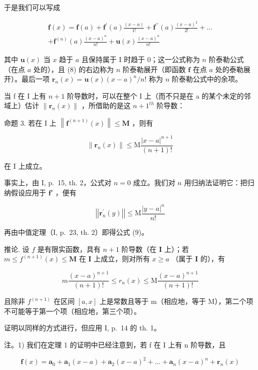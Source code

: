 于是我们可以写成

\[
\begin{array}{c} \mathbf {f} (x) = \mathbf {f} (a) + \mathbf {f} ^ {\prime} (a) \frac {(x - a)}{1 !} + \mathbf {f} ^ {\prime \prime} (a) \frac {(x - a) ^ {2}}{2 !} + \dots \\ + \mathbf {f} ^ {(n)} (a) \frac {(x - a) ^ {n}}{n !} + \mathbf {u} (x) \frac {(x - a) ^ {n}}{n !} \end{array}\tag{8}
\]

其中 \(\mathbf{u}(x)\) 当 \(x\) 趋于 \(a\) 且保持属于 I 时趋于 0；这一公式称为 \(n\) 阶泰勒公式（在点 \(a\) 处的），且 (8) 的右边称为 \(n\) 阶泰勒展开（即函数 \(\mathbf{f}\) 在点 \(a\) 处的泰勒展开）。最后一项 \(\mathbf{r}_n(x) = \mathbf{u}(x)(x - a)^n / n!\) 称为 \(n\) 阶泰勒公式中的余项。

当 f 在 I 上有 \(n + 1\) 阶导数时，可以在整个 I 上（而不只是在 a 的某个未定的邻域上）估计 \(\|\mathbf{r}_{n}(x)\|\) ，所借助的是这 \(n + 1^{th}\) 阶导数：

命题 3. 若在 I 上 \(\left\| \mathbf{f}^{(n + 1)}(x)\right\| \leqslant \mathbf{M}\) ，则有

\[
\| \mathbf {r} _ {n} (x) \| \leqslant \mathrm{M} \frac {| x - a | ^ {n + 1}}{(n + 1) !}\tag{9}
\]

在 I 上成立。

事实上，由 I, p.~15, th. 2，公式对 \(n = 0\) 成立。我们对 \(n\) 用归纳法证明它：把归纳假设应用于 \(\mathbf{f}'\) ，便有

\[
\left| \left| \mathbf {r} _ {n} ^ {\prime} (y) \right| \right| \leqslant \mathrm{M} \frac {| y - a | ^ {n}}{n !}
\]

再由中值定理（I, p.~23, th. 2）即得公式 (9)。

推论. 设 \(f\) 是有限实函数，具有 \(n + 1\) 阶导数（在 \(\mathbf{I}\) 上）；若 \(m \leqslant f^{(n + 1)}(x) \leqslant \mathbf{M}\) 在 \(\mathbf{I}\) 上成立，则对所有 \(x \geqslant a\) （属于 \(\mathbf{I}\) 的），有

\[
m \frac {(x - a) ^ {n + 1}}{(n + 1) !} \leqslant r _ {n} (x) \leqslant \mathrm{M} \frac {(x - a) ^ {n + 1}}{(n + 1) !}\tag{10}
\]

且除非 \(f^{(n+1)}\) 在区间 \([a, x]\) 上是常数且等于 m（相应地，等于 M），第二个项不可能等于第一个项（相应地，第三个项）。

证明以同样的方式进行，但应用 I, p.~14 的 th. 1。

注。1) 我们在定理 1 的证明中已经注意到，若 f 在 I 上有 n 阶导数，且

\[
\mathbf {f} (x) = \mathbf {a} _ {0} + \mathbf {a} _ {1} (x - a) + \mathbf {a} _ {2} (x - a) ^ {2} + \dots + \mathbf {a} _ {n} (x - a) ^ {n} + \mathbf {r} _ {n} (x)\tag{11}
\]

